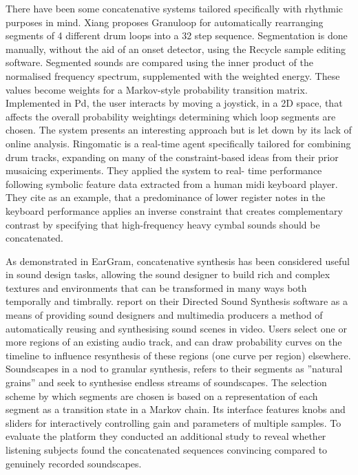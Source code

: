 There have been some concatenative systems tailored specifically with rhythmic purposes in mind. Xiang proposes Granuloop \citep{Xiang2002} for automatically rearranging segments of 4 different drum loops into a 32 step sequence. Segmentation is done manually, without the aid of an onset detector, using the Recycle sample editing software. Segmented sounds are compared using the inner product of the normalised frequency spectrum, supplemented with the weighted energy. These values become weights for a Markov-style probability transition matrix. Implemented in Pd, the user interacts by moving a joystick, in a 2D space, that affects the overall probability weightings determining which loop segments are chosen. The system presents an interesting approach but is let down by its lack of online analysis. Ringomatic \citep{Aucouturier2005} is a real-time agent specifically tailored for combining drum tracks, expanding on many of the constraint-based ideas from their prior musaicing experiments. They applied the system to real- time performance following symbolic feature data extracted from a human \acrshort{midi} keyboard player. They cite as an example, that a predominance of lower register notes in the keyboard performance applies an inverse constraint that creates complementary contrast by specifying that high-frequency heavy cymbal sounds should be concatenated.

As demonstrated in EarGram, concatenative synthesis has been considered useful in sound design tasks, allowing the sound designer to build rich and complex textures and environments that can be transformed in many ways both temporally and timbrally. \cite{Cardle2003} report on their Directed Sound Synthesis software as a means of providing sound designers and multimedia producers a method of automatically reusing and synthesising sound scenes in video. Users select one or more regions of an existing audio track, and can draw probability curves on the timeline to influence resynthesis of these regions (one curve per region) elsewhere. Soundscapes \citep{Hoskinson2001} in a nod to granular synthesis, refers to their segments as ”natural grains” and seek to synthesise endless streams of soundscapes. The selection scheme by which segments are chosen is based on a representation of each segment as a transition state in a Markov chain. Its interface features knobs and sliders for interactively controlling gain and parameters of multiple samples. To evaluate the platform they conducted an additional study \citep{Hoskinson2007} to reveal whether listening subjects found the concatenated sequences convincing compared to genuinely recorded soundscapes.

